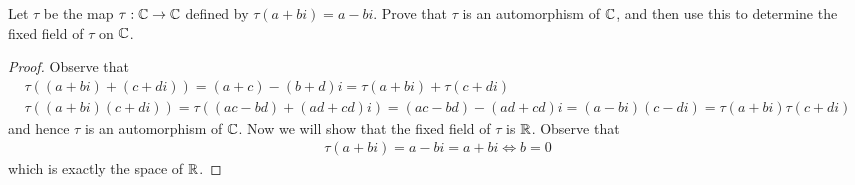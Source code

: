 \documentclass[num=10,duedate=04-14-21,course=Algebra\ II,proflastname=Walton]{hwtemplate}
\begin{document}

% 

\maketitle
\pagebreak
\problem[1]
\begin{claim}
	Let \(\tau \) be the map \(\tau :\mathbb{C}\to \mathbb{C}\) defined by \(\tau (a+bi) = a-bi\). Prove that \(\tau \) is an automorphism of \(\mathbb{C}\), and then use this to determine the fixed field of \(\tau \) on \(\mathbb{C}\).
\end{claim}

\begin{proof}
Observe that
\begin{align*}
	\tau((a+bi)+(c+di)) = (a+c) - (b+d)i = \tau(a+bi) + \tau (c+di)\\
	\tau((a+bi)(c+di)) = \tau ((ac-bd) + (ad+cd)i) = (ac-bd) - (ad+cd)i = (a-bi)(c-di) = \tau (a+bi)\tau (c+di)
\end{align*}
and hence \(\tau \) is an automorphism of \(\mathbb{C}\). Now we will show that the fixed field of \(\tau \) is \(\mathbb{R}\). Observe that
\begin{align*}
	\tau (a+bi) = a-bi = a+bi \iff b=0
\end{align*}
which is exactly the space of \(\mathbb{R}\).
\end{proof}
\end{document}
